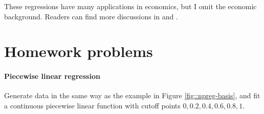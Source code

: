 These regressions have many applications in economics, but I omit the economic background. Readers can find more discussions in  \citet{angrist2008mostly} and \citet{card2015inference}.



\section{Homework problems}


\paragraph{Piecewise linear regression}

Generate data in the same way as the example in Figure \ref{fig::npreg-basis}, and fit a continuous piecewise linear function with cutoff points $0,0.2,0.4,0.6,0.8,1$. 

 

